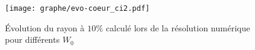 

	\begin{figure}[hbt!]
		\centering \texttt{[image: graphe/evo-coeur\_ci2.pdf]}
		\caption{Évolution du rayon à $10\%$ calculé lors de la résolution numérique pour différents $W_0$}
		\label{coeur_evo2}
	\end{figure}
	\FloatBarrier

